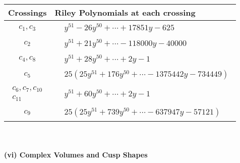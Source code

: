 \documentclass[1p]{elsarticle_modified}
\theoremstyle{definition}
\begin{document}
\begin{tabular}{m{50pt}|m{274pt}}
Crossings & \hspace{64pt}Riley Polynomials at each crossing \\
\hline $$\begin{aligned}c_{1},c_{3}\end{aligned}$$&$\begin{aligned}
&y^{51}-26 y^{50}+\cdots+17851 y-625
\end{aligned}$\\
\hline $$\begin{aligned}c_{2}\end{aligned}$$&$\begin{aligned}
&y^{51}+21 y^{50}+\cdots-118000 y-40000
\end{aligned}$\\
\hline $$\begin{aligned}c_{4},c_{8}\end{aligned}$$&$\begin{aligned}
&y^{51}+28 y^{50}+\cdots+2 y-1
\end{aligned}$\\
\hline $$\begin{aligned}c_{5}\end{aligned}$$&$\begin{aligned}
&25(25 y^{51}+176 y^{50}+\cdots-1375442 y-734449)
\end{aligned}$\\
\hline $$\begin{aligned}c_{6},c_{7},c_{10}\\c_{11}\end{aligned}$$&$\begin{aligned}
&y^{51}+60 y^{50}+\cdots+2 y-1
\end{aligned}$\\
\hline $$\begin{aligned}c_{9}\end{aligned}$$&$\begin{aligned}
&25(25 y^{51}+739 y^{50}+\cdots-637947 y-57121)
\end{aligned}$\\
\hline
\end{tabular}\\~\\
\newpage\flushleft \textbf{(vi) Complex Volumes and Cusp Shapes}
\end{document}
